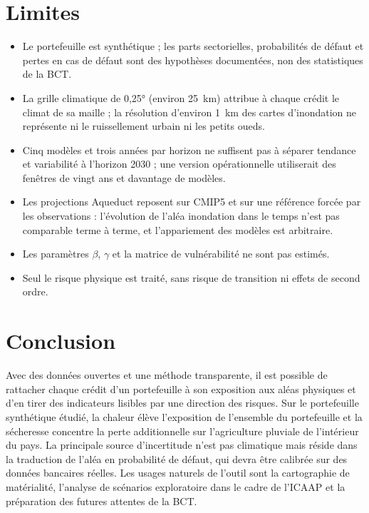\documentclass[11pt,a4paper]{article}
\begin{document}
\section{Limites}\label{sec:limites}

\begin{itemize}
\item Le portefeuille est synthétique ; les parts sectorielles, probabilités de défaut et pertes en cas de défaut sont des hypothèses documentées, non des statistiques de la BCT.
\item La grille climatique de 0,25° (environ 25~km) attribue à chaque crédit le climat de sa maille ; la résolution d'environ 1~km des cartes d'inondation ne représente ni le ruissellement urbain ni les petits oueds.
\item Cinq modèles et trois années par horizon ne suffisent pas à séparer tendance et variabilité à l'horizon 2030 ; une version opérationnelle utiliserait des fenêtres de vingt ans et davantage de modèles.
\item Les projections Aqueduct reposent sur CMIP5 et sur une référence forcée par les observations : l'évolution de l'aléa inondation dans le temps n'est pas comparable terme à terme, et l'appariement des modèles est arbitraire.
\item Les paramètres $\beta$, $\gamma$ et la matrice de vulnérabilité ne sont pas estimés.
\item Seul le risque physique est traité, sans risque de transition ni effets de second ordre.
\end{itemize}

\section{Conclusion}

Avec des données ouvertes et une méthode transparente, il est possible de rattacher chaque crédit d'un portefeuille à son exposition aux aléas physiques et d'en tirer des indicateurs lisibles par une direction des risques. Sur le portefeuille synthétique étudié, la chaleur élève l'exposition de l'ensemble du portefeuille et la sécheresse concentre la perte additionnelle sur l'agriculture pluviale de l'intérieur du pays. La principale source d'incertitude n'est pas climatique mais réside dans la traduction de l'aléa en probabilité de défaut, qui devra être calibrée sur des données bancaires réelles. Les usages naturels de l'outil sont la cartographie de matérialité, l'analyse de scénarios exploratoire dans le cadre de l'ICAAP \citep{ecb2020,eba2025} et la préparation des futures attentes de la BCT.
\end{document}
